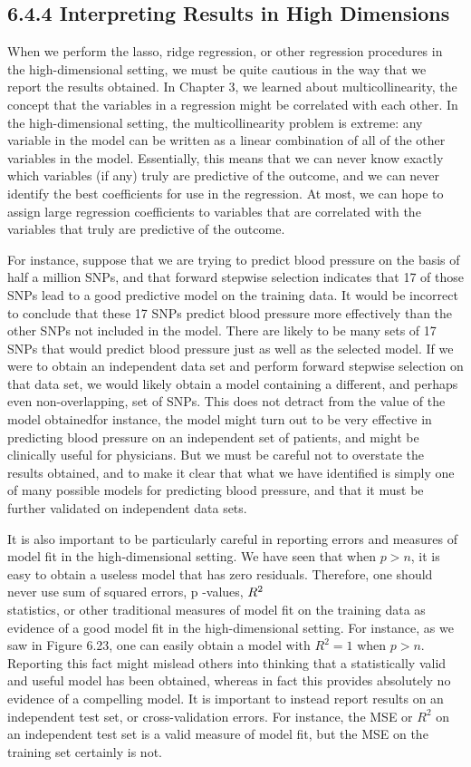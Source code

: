 \documentclass[10pt]{article}
\begin{document}
\subsection*{6.4.4 Interpreting Results in High Dimensions}
When we perform the lasso, ridge regression, or other regression procedures in the high-dimensional setting, we must be quite cautious in the way that we report the results obtained. In Chapter 3, we learned about multicollinearity, the concept that the variables in a regression might be correlated with each other. In the high-dimensional setting, the multicollinearity problem is extreme: any variable in the model can be written as a linear combination of all of the other variables in the model. Essentially, this means that we can never know exactly which variables (if any) truly are predictive of the outcome, and we can never identify the best coefficients for use in the regression. At most, we can hope to assign large regression coefficients to variables that are correlated with the variables that truly are predictive of the outcome.

For instance, suppose that we are trying to predict blood pressure on the basis of half a million SNPs, and that forward stepwise selection indicates that 17 of those SNPs lead to a good predictive model on the training data. It would be incorrect to conclude that these 17 SNPs predict blood pressure more effectively than the other SNPs not included in the model. There are likely to be many sets of 17 SNPs that would predict blood pressure just as well as the selected model. If we were to obtain an independent data set and perform forward stepwise selection on that data set, we would likely obtain a model containing a different, and perhaps even non-overlapping, set of SNPs. This does not detract from the value of the model obtainedfor instance, the model might turn out to be very effective in predicting blood pressure on an independent set of patients, and might be clinically useful for physicians. But we must be careful not to overstate the results obtained, and to make it clear that what we have identified is simply one of many possible models for predicting blood pressure, and that it must be further validated on independent data sets.

It is also important to be particularly careful in reporting errors and measures of model fit in the high-dimensional setting. We have seen that when $p>n$, it is easy to obtain a useless model that has zero residuals. Therefore, one should never use sum of squared errors, p -values, $R^{
2}$\\
statistics, or other traditional measures of model fit on the training data as evidence of a good model fit in the high-dimensional setting. For instance, as we saw in Figure 6.23, one can easily obtain a model with $R^{2}=1$ when $p>n$. Reporting this fact might mislead others into thinking that a statistically valid and useful model has been obtained, whereas in fact this provides absolutely no evidence of a compelling model. It is important to instead report results on an independent test set, or cross-validation errors. For instance, the MSE or $R^{2}$ on an independent test set is a valid measure of model fit, but the MSE on the training set certainly is not.
\end{document}
